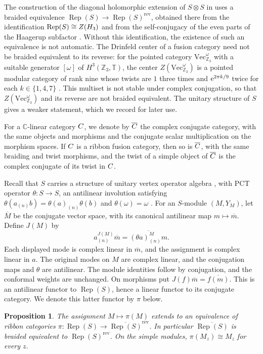 \documentclass[leqno]{article}
\newcommand{\Cbb}{\ensuremath{\mathbb{C}}}
\let\cal\relax
\newcommand{\cal}{\mathcal}
\newcommand{\Z}{\ensuremath{\mathbb{Z}}}
\newcommand{\co}{\colon}
\newcommand{\ot}{\otimes}
\newcommand{\ovl}{\overline}
\let\i\relax
\newcommand{\i}{\mathrm{i}}
\newcommand{\e}{\mathrm{e}}
\DeclareMathOperator{\Rep}{Rep}
\newtheorem{prop}[thm]{Proposition}
\numberwithin{equation}{section}
\begin{document}
The construction of the diagonal holomorphic extension of $S \ot S$ in \cite[Proposition 7.12]{ArhII} uses a braided equivalence $\Rep(S) \to \Rep(S)^{\mathrm{rev}}$, obtained there from the identification $\Rep(S) \cong Z(\cal H_3)$ and from the self-conjugacy of the even parts of the Haagerup subfactor \cite{JMS14}. Without this identification, the existence of such an equivalence is not automatic. The Drinfeld center of a fusion category need not be braided equivalent to its reverse: for the pointed category $\mathrm{Vec}_{\Z_3}^\omega$ with a suitable generator $[\omega]$ of $H^3(\Z_3,\mathbb T)$, the center $Z(\mathrm{Vec}_{\Z_3}^\omega)$ is a pointed modular category of rank nine whose twists are $1$ three times and $\e^{2\pi\i k/9}$ twice for each $k \in \{1,4,7\}$ \cite[Section 8.5]{EGNO15}. This multiset is not stable under complex conjugation, so that $Z(\mathrm{Vec}_{\Z_3}^\omega)$ and its reverse are not braided equivalent. The unitary structure of $S$ gives a weaker statement, which we record for later use.

For a $\Cbb$-linear category $\cal C$, we denote by $\ovl{\cal C}$ the complex conjugate category, with the same objects and morphisms and the conjugate scalar multiplication on the morphism spaces. If $\cal C$ is a ribbon fusion category, then so is $\ovl{\cal C}$, with the same braiding and twist morphisms, and the twist of a simple object of $\ovl{\cal C}$ is the complex conjugate of its twist in $\cal C$.

Recall that $S$ carries a structure of unitary vertex operator algebra \cite[Theorem 10.10]{Arh26}, with PCT operator $\theta \co S \to S$, an antilinear involution satisfying $\theta(a_{(n)}b) = \theta(a)_{(n)}\theta(b)$ and $\theta(\omega) = \omega$ \cite[Definition 2.1]{DoL14}. For an $S$-module $(M,Y_M)$, let $\overline M$ be the conjugate vector space, with its canonical antilinear map $m\mapsto\overline m$. Define $J(M)$ by
\[
a_{(n)}^{J(M)}\overline m = \overline{(\theta a)_{(n)}^M m}.
\]
Each displayed mode is complex linear in $\overline m$, and the assignment is complex linear in $a$. The original modes on $M$ are complex linear, and the conjugation maps and $\theta$ are antilinear. The module identities follow by conjugation, and the conformal weights are unchanged. On morphisms put $J(f)\overline m = \overline{f(m)}$. This is an antilinear functor to $\Rep(S)$, hence a linear functor to its conjugate category. We denote this latter functor by $\pi$ below.

\begin{prop}
\label{prop:conjugation}
The assignment $M \mapsto \pi(M)$ extends to an equivalence of ribbon categories $\pi \co \Rep(S) \to \ovl{\Rep(S)}^{\mathrm{rev}}$. In particular $\ovl{\Rep(S)}$ is braided equivalent to $\Rep(S)^{\mathrm{rev}}$. On the simple modules, $\pi(M_z) \cong M_z$ for every $z$.
\end{prop}
\end{document}
